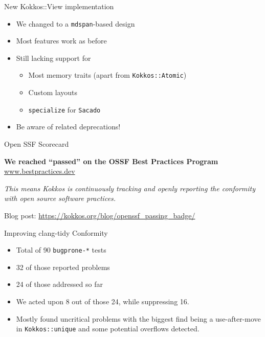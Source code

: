 \begin{frame}[fragile]{New Kokkos::View implementation}
  \begin{itemize}
    \item We changed to a \texttt{mdspan}-based design
    \item Most features work as before
    \item Still lacking support for
      \begin{itemize}
        \item Most memory traits (apart from \texttt{Kokkos::Atomic})
        \item Custom layouts
        \item \texttt{specialize} for \texttt{Sacado}
      \end{itemize}
    \item Be aware of related deprecations!
  \end{itemize}
\end{frame}

\begin{frame}[fragile]{Open SSF Scorecard}
\begin{center}
\textbf{We reached ``passed'' on the OSSF Best Practices Program}
\href{https://www.bestpractices.dev/en/projects/9344}{www.bestpractices.dev}

\vspace{0.5cm}
\textit{This means Kokkos is continuously tracking and openly reporting the conformity with open source software practices.}

Blog post: \url{https://kokkos.org/blog/openssf_passing_badge/}
\end{center}
\end{frame}

\begin{frame}[fragile]{Improving clang-tidy Conformity}
\begin{itemize}
    \item Total of 90 \texttt{bugprone-*} tests
    \item 32 of those reported problems
    \item 24 of those addressed so far
    \item We acted upon 8 out of those 24, while suppressing 16.
    \item Mostly found uncritical problems with the biggest find being a use-after-move in \texttt{Kokkos::unique} and some potential overflows detected.
\end{itemize}
\end{frame}

